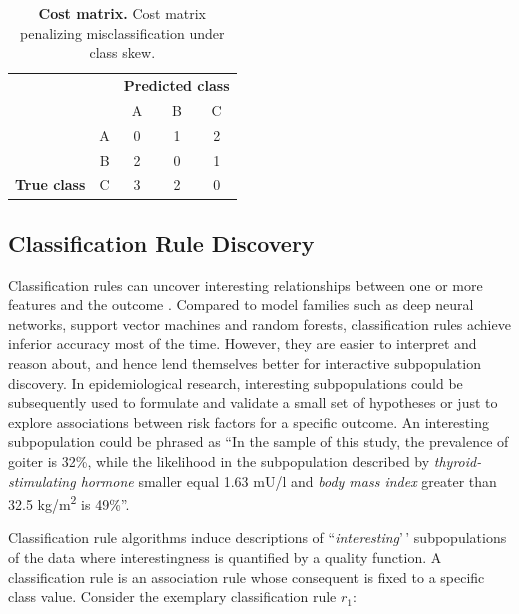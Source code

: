 \documentclass[
  oneside]{book}
\begin{document}
\begin{table}

\caption{\label{tab:03-costmatrix}\textbf{Cost matrix.} Cost matrix penalizing misclassification under class skew.}
\centering
\begin{tabular}[t]{>{}ccccc}
\toprule
\multicolumn{2}{c}{\textbf{ }} & \multicolumn{3}{c}{\textbf{Predicted class}} \\
\cmidrule(l{3pt}r{3pt}){3-5}
   &   & A & B & C\\
\midrule
 & A & 0 & 1 & 2\\

 & B & 2 & 0 & 1\\

\multirow{-3}{*}{\centering\arraybackslash \textbf{True class}} & C & 3 & 2 & 0\\
\bottomrule
\end{tabular}
\end{table}

\hypertarget{imm-classification}{%
\subsection{Classification Rule Discovery}\label{imm-classification}}

Classification rules can uncover interesting relationships between one or more features and the outcome \autocite{Fuernkranz:12,Herrera11}.
Compared to model families such as deep neural networks, support vector machines and random forests, classification rules achieve inferior accuracy most of the time.
However, they are easier to interpret and reason about, and hence lend themselves better for interactive subpopulation discovery.
In epidemiological research, interesting subpopulations could be subsequently used to formulate and validate a small set of hypotheses or just to explore associations between risk factors for a specific outcome.
An interesting subpopulation could be phrased as ``In the sample of this study, the prevalence of goiter is 32\%, while the likelihood in the subpopulation described by \emph{thyroid-stimulating hormone} smaller equal 1.63 mU/l and \emph{body mass index} greater than 32.5 kg/m\textsuperscript{2} is 49\%''.

Classification rule algorithms induce descriptions of ``\emph{interesting}'\,' subpopulations of the data where interestingness is quantified by a quality function.
A classification rule is an association rule whose consequent is fixed to a specific class value.
Consider the exemplary classification rule \(r_1\):
\end{document}
